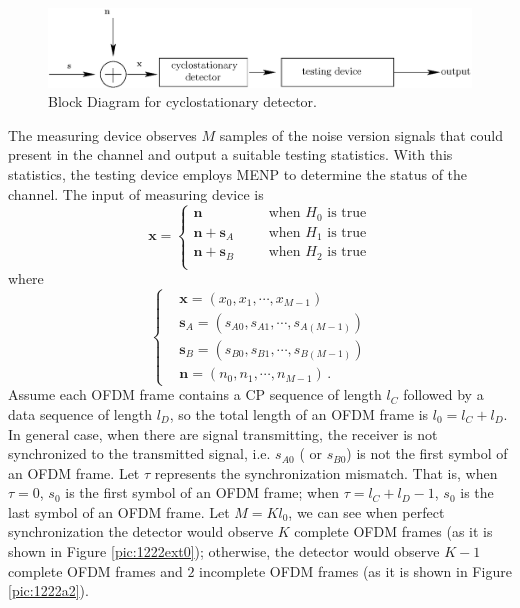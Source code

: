 \begin{figure}[!t]
  \centering 
  \includegraphics[width=\textwidth]{4/fig1.eps}
  \caption{Block Diagram for  cyclostationary detector.}
  \label{pic:1222a0}
\end{figure}
The measuring device observes $M$ samples of the noise version signals that could present in the channel and output a suitable testing statistics. With this statistics, the testing device employs MENP to determine the status of the channel. The input of measuring device is
\begin{equation}
  \mathbf{x} = \begin{cases}
	\mathbf{n}\;\;\;\;\;\;&\text{when $H_0$ is true}\\
	\mathbf{n}+\mathbf{s}_A\;\;\;\;\;\;&\text{when $H_1$ is true}\\
	\mathbf{n}+\mathbf{s}_B\;\;\;\;\;\;&\text{when $H_2$ is true}\\
  \end{cases}
  \label{equ:1209a1}
\end{equation}
where 
\begin{equation}
  \begin{cases}
	&\mathbf{x} = (x_0, x_1, \cdots, x_{M-1})\\
	&\mathbf{s}_A = (s_{A0}, s_{A1}, \cdots, s_{A(M-1)})\\
	&\mathbf{s}_B = (s_{B0}, s_{B1}, \cdots, s_{B(M-1)})\\
	&\mathbf{n} = (n_{0}, n_{1}, \cdots, n_{M-1})\,.
  \end{cases}
  \label{xssn}
\end{equation}
Assume each OFDM frame contains a CP sequence of length $l_C$ followed by a data sequence of length $l_D$, so the total length of an OFDM frame is $l_0 = l_C+l_D$. In general case, when there are signal transmitting, the receiver is not synchronized to the transmitted signal, i.e. $s_{A0}$ ( or $s_{B0}$) is not the first symbol of an OFDM frame. Let $\tau$ represents the synchronization mismatch. That is, when $\tau = 0$, $s_0$ is the first symbol of an OFDM frame; when $\tau = l_C+l_D -1$, $s_0$ is the last symbol of an OFDM frame. Let $M = Kl_0$, we can see when perfect synchronization the detector would observe $K$ complete  OFDM frames (as it is shown in Figure \ref{pic:1222ext0}); otherwise, the detector would observe $K-1$ complete OFDM frames and $2$ incomplete OFDM frames (as it is shown in Figure \ref{pic:1222a2}). 
